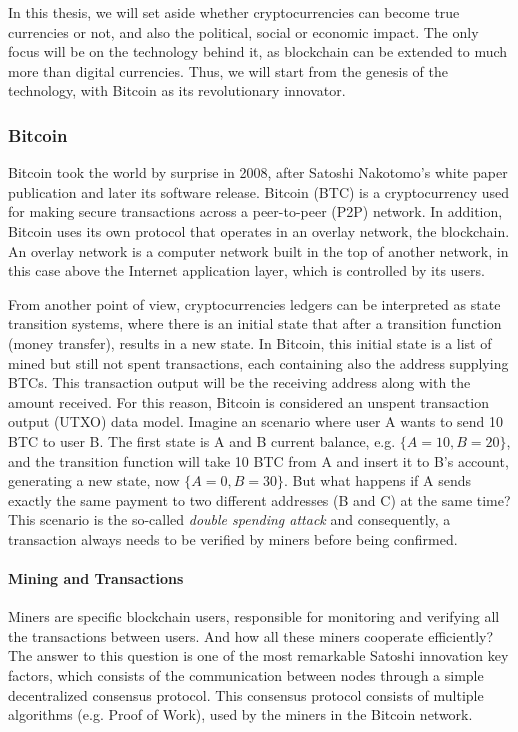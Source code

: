 In this thesis, we will set aside whether cryptocurrencies can become true currencies or not, and also the political, social or economic impact. The only focus will be on the technology behind it, as blockchain can be extended to much more than digital currencies. Thus, we will start from the genesis of the technology, with Bitcoin as its revolutionary innovator.


\subsubsection{Bitcoin}

Bitcoin took the world by surprise in 2008, after Satoshi Nakotomo's white paper publication \cite{nakamoto2008bitcoin} and later its software release. Bitcoin (BTC) is a cryptocurrency used for making secure transactions across a peer-to-peer (P2P) network. In addition, Bitcoin uses its own protocol that operates in an overlay network, the blockchain. An overlay network is a computer network built in the top of another network, in this case above the Internet application layer, which is controlled by its users.

From another point of view, cryptocurrencies ledgers can be interpreted as state transition systems, where there is an initial state that after a transition function (money transfer), results in a new state. In Bitcoin, this initial state is a list of mined but still not spent transactions, each containing also the address supplying BTCs. This transaction output will be the receiving address along with the amount received. For this reason, Bitcoin is considered an unspent transaction output (UTXO) data model. Imagine an scenario where user A wants to send 10 BTC to user B. The first state is A and B current balance, e.g. $\{A = 10, B = 20\}$, and the transition function will take 10 BTC from A and insert it to B's account, generating a new state, now $\{A = 0, B = 30\}$. But what happens if A sends exactly the same payment to two different addresses (B and C) at the same time? This scenario is the so-called \textit{double spending attack} and consequently, a transaction always needs to be verified by miners before being confirmed. 

\paragraph{Mining and Transactions} \label{mining_Transactions}

Miners are specific blockchain users, responsible for monitoring and verifying all the transactions between users. And how all these miners cooperate efficiently? The answer to this question is one of the most remarkable Satoshi innovation key factors, which consists of the communication between nodes through a simple decentralized consensus protocol. This consensus protocol consists of multiple algorithms (e.g. Proof of Work), used by the miners in the Bitcoin network.

